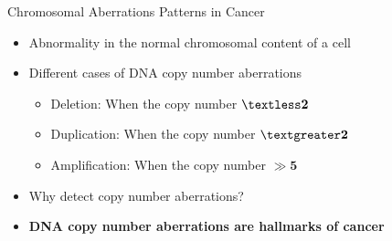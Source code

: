 \documentclass[first=dgreen,second=purple,logo=redexc]{aaltoslides}
\begin{document}
\begin{frame}{Chromosomal Aberrations Patterns in Cancer}
\begin{itemize} \setlength{\itemsep}{6mm}
  \item Abnormality in the normal chromosomal content of a cell
  \item Different cases of DNA copy number aberrations
  \begin{itemize}\setlength{\itemsep}{2.5mm}
    \item Deletion: When the copy number $\boldsymbol{\textless 2} $ 
    \item Duplication: When the copy number $\boldsymbol{\textgreater 2}$
    \item Amplification: When the copy number $\boldsymbol {\gg 5}$
  \end{itemize}
  \item Why detect copy number aberrations?
\pause   \item \textbf{{\color{red}DNA copy number aberrations are hallmarks of cancer}}
\end{itemize}
\end{frame}

\end{document}
